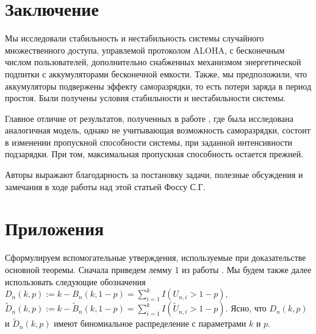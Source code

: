 \documentclass[10pt, reqno]{amsart}
\begin{document}
\section{Заключение} 
Мы исследовали стабильность и нестабильность системы случайного множественного доступа, управлемой протоколом ALOHA, с бесконечным числом пользователей, дополнительно снабженных механизмом энергетической подпитки с аккумуляторами бесконечной емкости. Также, мы предположили, что аккумуляторы подвержены эффекту саморазрядки, то есть потери заряда в период простоя. Были получены условия стабильности и нестабильности системы.

Главное отличие от результатов, полученных в работе \cite{Rezler_Chebunin}, где была исследована аналогичная модель, однако не учитывающая возможность саморазрядки, состоит в изменении пропускной способности системы, при заданной интенсивности подзарядки. При том, максимальная пропускная способность остается прежней.

Авторы выражают благодарность за постановку задачи, полезные обсуждения и замечания в ходе работы над этой статьей Фоссу С.Г.

\section{Приложения}
Сформулируем вспомогательные утверждения, используемые при доказательстве основной теоремы. Сначала приведем лемму 1 из работы \cite{Foss_original}. Мы будем также далее использовать следующие обозначения $D_{n}(k, p) := k - B_{n}(k, 1-p) = \sum_{i=1}^{k}I(U_{n,i} > 1-p)$, $\widetilde{D}_{n}(k, p) := k - \widetilde{B}_{n}(k, 1-p) = \sum_{i=1}^{k}I(\widetilde{U}_{n,i} > 1-p)$. Ясно, что $D_{n}(k, p)$ и $\widetilde{D}_{n}(k, p)$ имеют биномиальное распределение с параметрами $k$ и $p$.
\end{document}
